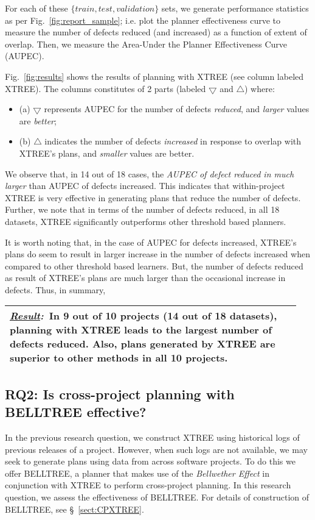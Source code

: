 \documentclass[smallextended]{svjour3}       %
\newcommand{\result}[1]{
\vspace{0.2cm}
\noindent\begin{minipage}{\linewidth}
\begin{tabular}{|p{0.95\linewidth}|}
\hline\vspace{-0.2cm}
\textbf{\textit{\underline{Result}:}}~#1\\\hline
\end{tabular}
\end{minipage}\bigstrut
}
\newcommand{\tion}[1]{\S~\ref{sect:#1}}
\newcommand{\fig}[1]{Fig.~\ref{fig:#1}}
\begin{document}
For each of these $\{train, test, validation\}$ sets, we generate performance statistics as per \fig{report_sample}; i.e. plot the planner effectiveness curve to measure the number of defects reduced (and increased) as a function of extent of overlap. Then, we measure the Area-Under the Planner Effectiveness Curve (AUPEC).

\fig{results}\protect{} shows the results of planning with XTREE (see column labeled XTREE). The columns constitutes of 2 parts (labeled $\bigtriangledown$ and $\bigtriangleup$) where: 
\begin{itemize}[leftmargin=-1pt]
  \item[] (a) $\bigtriangledown$ represents AUPEC for the number of defects \textit{reduced}, and \textit{larger} values are \textit{better};
  \item[] (b) $\bigtriangleup$ indicates the number of defects \textit{increased} in response to overlap with XTREE's plans, and \textit{smaller} values are better. 
\end{itemize}

We observe that,  in 14 out of 18 cases, the \textit{AUPEC of defect reduced in much larger} than AUPEC of defects increased. This indicates that within-project XTREE is very effective in generating plans that reduce the number of defects. Further, we note that in terms of the number of defects reduced, in all 18 datasets, XTREE significantly outperforms other threshold based planners.

It is worth noting that, in the case of AUPEC for defects increased, XTREE's plans do seem to result in larger increase in the number of defects increased when compared to other threshold based learners. But, the number of defects reduced as result of XTREE's plans are much larger than the occasional increase in defects. Thus, in summary, 

\result{In 9 out of 10 projects (14 out of 18 datasets), planning with XTREE leads to the largest number of defects reduced. Also, plans generated by XTREE are superior to other methods in all 10 projects.}
\vspace{-0.4cm}


\subsection*{{\bf RQ2: Is cross-project planning with BELLTREE effective?}}

In the previous research question, we construct XTREE using historical logs of previous releases of a project. However, when such logs are not available, we may seek to generate plans using data from across software projects. To do this we offer BELLTREE, a planner that makes use of the \textit{Bellwether Effect} in conjunction with XTREE to perform cross-project planning. In this research question, we assess the effectiveness of BELLTREE. For details of construction of BELLTREE, see \tion{CPXTREE}.
\end{document}

